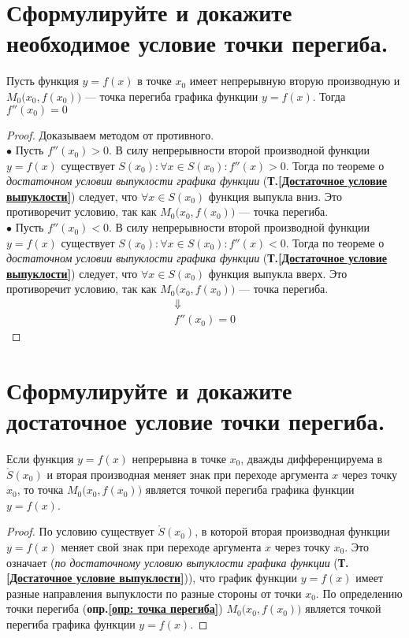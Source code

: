 \newpage
\section{Сформулируйте и докажите необходимое условие точки перегиба.}

\begin{theorem}
	Пусть функция $y=f(x)$ в точке $x_0$ имеет непрерывную вторую производную и $M_0\big(x_0, f(x_0)\big)$ --- точка перегиба графика функции $y=f(x)$. Тогда $f''(x_0) = 0$
\end{theorem}
\begin{proof}
	Доказываем методом от противного.\\[1ex]
	$\bullet$ Пусть $f''(x_0) > 0$. В силу непрерывности второй производной функции $y=f(x)$ существует $S(x_0)\colon \forall x \in S(x_0)\colon f''(x) > 0$. Тогда по теореме о \textit{достаточном условии выпуклости графика функции} (\textbf{Т.\ref{Достаточное условие выпуклости}}) следует, что $\forall x \in S(x_0)$ функция выпукла вниз. Это противоречит условию, так как $M_0\big(x_0, f(x_0)\big)$ --- точка перегиба. \\[1ex]
	$\bullet$ Пусть $f''(x_0) < 0$. В силу непрерывности второй производной функции $y=f(x)$ существует $S(x_0)\colon \forall x \in S(x_0)\colon f''(x) < 0$. Тогда по теореме о \textit{достаточном условии выпуклости графика функции} (\textbf{Т.\ref{Достаточное условие выпуклости}}) следует, что $\forall x \in S(x_0)$ функция выпукла вверх. Это противоречит условию, так как $M_0\big(x_0, f(x_0)\big)$ --- точка перегиба.
	\begin{gather*}
		\Downarrow\\
		f''(x_0) = 0
	\end{gather*}	
\end{proof}

\section{Сформулируйте и докажите достаточное условие точки перегиба.}

\begin{theorem}
	Если функция $y=f(x)$ непрерывна в точке $x_0$, дважды дифференцируема в $\mathring{S}(x_0)$ и вторая производная меняет знак при переходе аргумента $x$ через точку $x_0$, то точка $M_0\big(x_0, f(x_0)\big)$ является точкой перегиба графика функции $y=f(x)$.
\end{theorem}
\begin{proof}
	По условию существует $\mathring{S}(x_0)$, в которой вторая производная функции $y=f(x)$ меняет свой знак при переходе аргумента $x$ через точку $x_0$. Это означает (\textit{по достаточному условию выпуклости графика функции} (\textbf{Т.\ref{Достаточное условие выпуклости}})), что график функции $y=f(x)$ имеет разные направления выпуклости по разные стороны от точки $x_0$. По определению точки перегиба (\textbf{опр.\ref{опр: точка перегиба}}) $M_0\big(x_0, f(x_0)\big)$ является точкой перегиба графика функции $y=f(x)$.
\end{proof}

